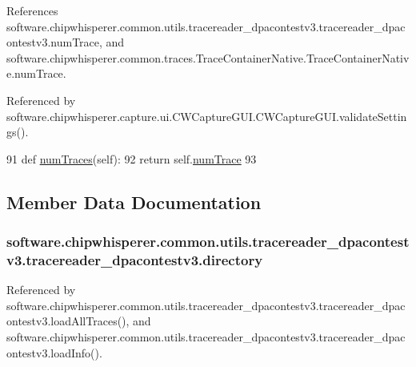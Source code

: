 References software.\+chipwhisperer.\+common.\+utils.\+tracereader\+\_\+dpacontestv3.\+tracereader\+\_\+dpacontestv3.\+num\+Trace, and software.\+chipwhisperer.\+common.\+traces.\+Trace\+Container\+Native.\+Trace\+Container\+Native.\+num\+Trace.



Referenced by software.\+chipwhisperer.\+capture.\+ui.\+C\+W\+Capture\+G\+U\+I.\+C\+W\+Capture\+G\+U\+I.\+validate\+Settings().


\begin{DoxyCode}
91     \textcolor{keyword}{def }\hyperlink{classsoftware_1_1chipwhisperer_1_1common_1_1utils_1_1tracereader__dpacontestv3_1_1tracereader__dpacontestv3_ae96ac42e85bbd26506f18a40602c339d}{numTraces}(self):
92         \textcolor{keywordflow}{return} self.\hyperlink{classsoftware_1_1chipwhisperer_1_1common_1_1utils_1_1tracereader__dpacontestv3_1_1tracereader__dpacontestv3_affc3222736ab6ef8dfc06a6062e33953}{numTrace}
93 
\end{DoxyCode}


\subsection{Member Data Documentation}
\hypertarget{classsoftware_1_1chipwhisperer_1_1common_1_1utils_1_1tracereader__dpacontestv3_1_1tracereader__dpacontestv3_ad402c05950f2745c151f038817959c2b}{}
\subsubsection[{directory}]{\setlength{\rightskip}{0pt plus 5cm}software.\+chipwhisperer.\+common.\+utils.\+tracereader\+\_\+dpacontestv3.\+tracereader\+\_\+dpacontestv3.\+directory}\label{classsoftware_1_1chipwhisperer_1_1common_1_1utils_1_1tracereader__dpacontestv3_1_1tracereader__dpacontestv3_ad402c05950f2745c151f038817959c2b}


Referenced by software.\+chipwhisperer.\+common.\+utils.\+tracereader\+\_\+dpacontestv3.\+tracereader\+\_\+dpacontestv3.\+load\+All\+Traces(), and software.\+chipwhisperer.\+common.\+utils.\+tracereader\+\_\+dpacontestv3.\+tracereader\+\_\+dpacontestv3.\+load\+Info().

